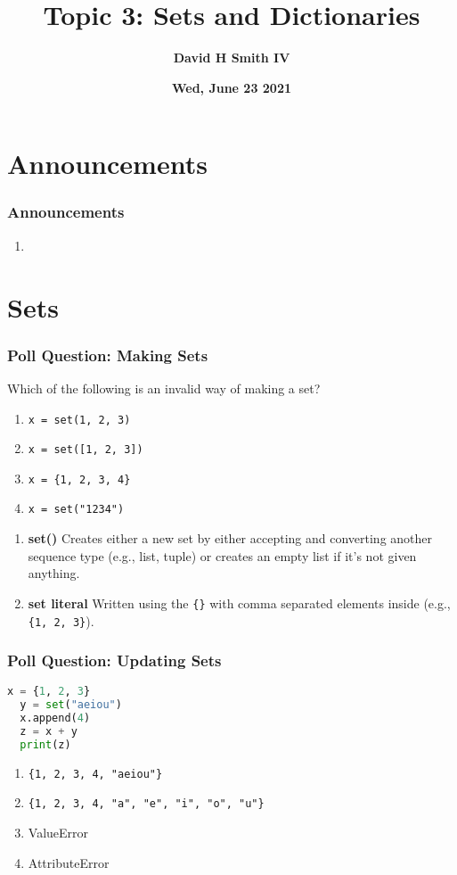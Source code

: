 \documentclass{beamer}
\title{\textbf{Topic 3: Sets and Dictionaries}}
\author{\textbf{David H Smith IV}}
\institute[\textbf{UIUC}]{\textbf{University of Illinois Urbana-Champaign}}
\date{\textbf{Wed, June 23 2021}}
\begin{document}
\frame{\titlepage}

\section{Announcements}

%
%
\begin{frame}
  \frametitle{Announcements}
  \begin{enumerate}
    \item 
  \end{enumerate}
\end{frame}

\section{Sets}

%
%
\begin{frame}[fragile]
  \frametitle{Poll Question: Making Sets}
  Which of the following is an invalid way of making a set?
  \begin{enumerate}[A] 
    \item \lstinline|x = set(1, 2, 3)| 
    \item \lstinline|x = set([1, 2, 3])| 
    \item \lstinline|x = {1, 2, 3, 4}| 
    \item \lstinline|x = set("1234")|
  \end{enumerate}
  \pause
  \vfill
  \vfill
  \begin{enumerate}
    \item \textbf{set()} \textrightarrow Creates either a new set by either accepting and converting another sequence type (e.g., list, tuple) or creates an empty list if it's not given anything.
    \item \textbf{set literal} \textrightarrow Written using the \lstinline|{}| with comma separated elements inside (e.g., \lstinline|{1, 2, 3}|).
  \end{enumerate}
\end{frame}


%

\begin{frame}[fragile]
  \frametitle{Poll Question: Updating Sets}
  \begin{lstlisting}[language=Python, autogobble]
  x = {1, 2, 3}
  y = set("aeiou")
  x.append(4)
  z = x + y
  print(z)
  \end{lstlisting}
  \vfill
  \begin{enumerate}[A] 
    \item \lstinline|{1, 2, 3, 4, "aeiou"}|
    \item \lstinline|{1, 2, 3, 4, "a", "e", "i", "o", "u"}|
    \item ValueError
    \item AttributeError
  \end{enumerate}
\end{frame}
\end{document}
